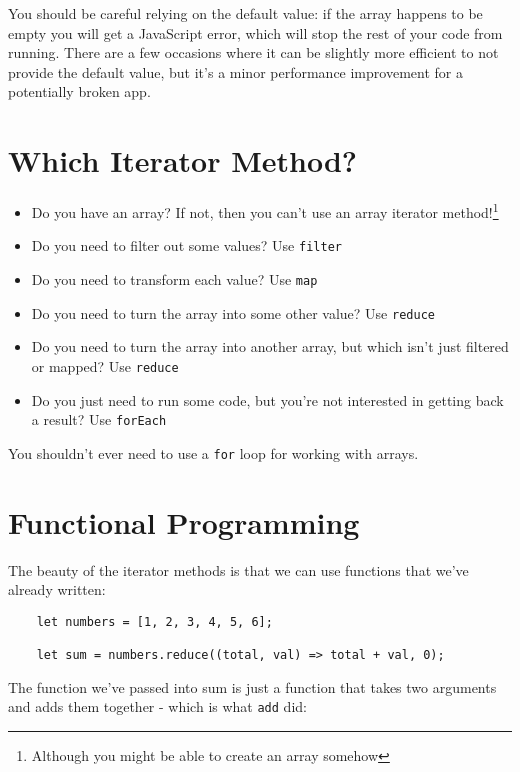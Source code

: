 You should be careful relying on the default value: if the array happens to be empty you will get a JavaScript error, which will stop the rest of your code from running. There are a few occasions where it can be slightly more efficient to not provide the default value, but it's a minor performance improvement for a potentially broken app.



\section{Which Iterator Method?}

\begin{itemize}
    \item Do you have an array? If not, then you can't use an array iterator method!\footnote{Although you might be able to create an array somehow}
    \item Do you need to filter out some values? Use \texttt{filter}
    \item Do you need to transform each value? Use \texttt{map}
    \item Do you need to turn the array into some other value? Use \texttt{reduce}
    \item Do you need to turn the array into another array, but which isn't just filtered or mapped? Use \texttt{reduce}
    \item Do you just need to run some code, but you're not interested in getting back a result? Use \texttt{forEach}
\end{itemize}

You shouldn't ever need to use a \texttt{for} loop for working with arrays.


\pagebreak

\section{Functional Programming}

The beauty of the iterator methods is that we can use functions that we've already written:

\begin{verbatim}
    let numbers = [1, 2, 3, 4, 5, 6];

    let sum = numbers.reduce((total, val) => total + val, 0);
\end{verbatim}

The function we've passed into sum is just a function that takes two arguments and adds them together - which is what \texttt{add} did:

